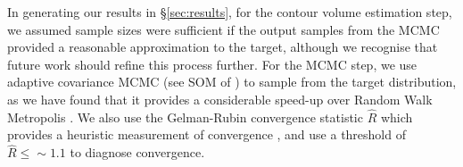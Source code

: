 In generating our results in \S\ref{sec:results}, for the contour volume estimation step, we assumed sample sizes were sufficient if the output samples from the MCMC provided a reasonable approximation to the target, although we recognise that future work should refine this process further. For the MCMC step, we use adaptive covariance MCMC (see SOM of \cite{johnstone2016uncertainty}) to sample from the target distribution, as we have found that it provides a considerable speed-up over Random Walk Metropolis \cite{metropolis1953equation,lambert2018Student}. We also use the Gelman-Rubin convergence statistic $\hat{R}$ which provides a heuristic measurement of convergence \cite{lambert2018Student,gelman1992inference}, and use a threshold of $\hat{R}\leq\sim 1.1$ to diagnose convergence.
